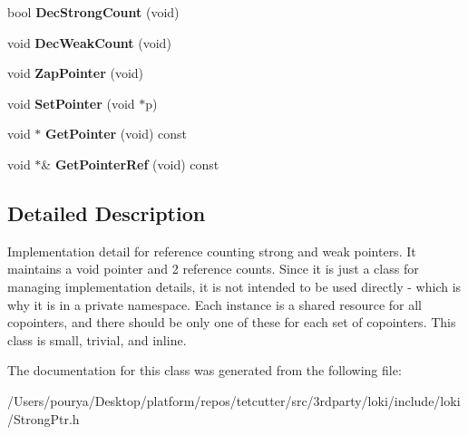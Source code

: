 \begin{DoxyCompactItemize}
\item 
\hypertarget{classLoki_1_1Private_1_1TwoRefCountInfo_a88621200e94fc594ba323a4407953f84}{}bool {\bfseries Dec\+Strong\+Count} (void)\label{classLoki_1_1Private_1_1TwoRefCountInfo_a88621200e94fc594ba323a4407953f84}

\item 
\hypertarget{classLoki_1_1Private_1_1TwoRefCountInfo_aa1ff44e3904668bef02e88ee657bf8e9}{}void {\bfseries Dec\+Weak\+Count} (void)\label{classLoki_1_1Private_1_1TwoRefCountInfo_aa1ff44e3904668bef02e88ee657bf8e9}

\item 
\hypertarget{classLoki_1_1Private_1_1TwoRefCountInfo_a883e9c6365094cada92d85824bf8678d}{}void {\bfseries Zap\+Pointer} (void)\label{classLoki_1_1Private_1_1TwoRefCountInfo_a883e9c6365094cada92d85824bf8678d}

\item 
\hypertarget{classLoki_1_1Private_1_1TwoRefCountInfo_a0bcc0c04c0797735a3d669ef17c1844c}{}void {\bfseries Set\+Pointer} (void $\ast$p)\label{classLoki_1_1Private_1_1TwoRefCountInfo_a0bcc0c04c0797735a3d669ef17c1844c}

\item 
\hypertarget{classLoki_1_1Private_1_1TwoRefCountInfo_adfb7c18019573638bf12fda69a030208}{}void $\ast$ {\bfseries Get\+Pointer} (void) const \label{classLoki_1_1Private_1_1TwoRefCountInfo_adfb7c18019573638bf12fda69a030208}

\item 
\hypertarget{classLoki_1_1Private_1_1TwoRefCountInfo_ae221933ef016782aca8c54067848cac9}{}void $\ast$\& {\bfseries Get\+Pointer\+Ref} (void) const \label{classLoki_1_1Private_1_1TwoRefCountInfo_ae221933ef016782aca8c54067848cac9}

\end{DoxyCompactItemize}


\subsection{Detailed Description}
Implementation detail for reference counting strong and weak pointers. It maintains a void pointer and 2 reference counts. Since it is just a class for managing implementation details, it is not intended to be used directly -\/ which is why it is in a private namespace. Each instance is a shared resource for all copointers, and there should be only one of these for each set of copointers. This class is small, trivial, and inline. 

The documentation for this class was generated from the following file\+:\begin{DoxyCompactItemize}
\item 
/\+Users/pourya/\+Desktop/platform/repos/tetcutter/src/3rdparty/loki/include/loki/Strong\+Ptr.\+h\end{DoxyCompactItemize}
